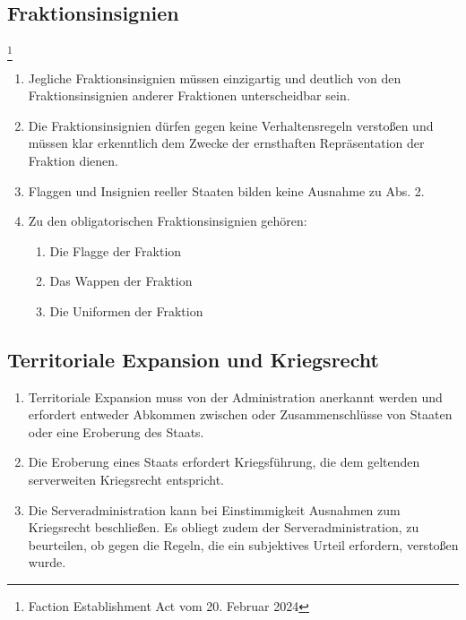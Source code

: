 \documentclass{article}
\begin{document}
\subsection{Fraktionsinsignien}\footnote{Faction Establishment Act vom 20. Februar 2024}
\begin{enumerate}[(1)]
    \item Jegliche Fraktionsinsignien müssen einzigartig und deutlich von den Fraktionsinsignien anderer Fraktionen unterscheidbar sein.
    \item Die Fraktionsinsignien dürfen gegen keine Verhaltensregeln verstoßen und müssen klar erkenntlich dem Zwecke der ernsthaften Repräsentation der Fraktion dienen.
    \item Flaggen und Insignien reeller Staaten bilden keine Ausnahme zu Abs. 2.
    \item Zu den obligatorischen Fraktionsinsignien gehören:
    \begin{enumerate}[1.]
        \item Die Flagge der Fraktion
        \item Das Wappen der Fraktion
        \item Die Uniformen der Fraktion
    \end{enumerate}
\end{enumerate}

\subsection{Territoriale Expansion und Kriegsrecht}
\begin{enumerate}[(1)]
    \item Territoriale Expansion muss von der Administration anerkannt werden und erfordert entweder Abkommen zwischen oder Zusammenschlüsse von Staaten oder eine Eroberung des Staats.
    \item Die Eroberung eines Staats erfordert Kriegsführung, die dem geltenden serverweiten Kriegsrecht entspricht.
    \item Die Serveradministration kann bei Einstimmigkeit Ausnahmen zum Kriegsrecht beschließen. Es obliegt zudem der Serveradministration, zu beurteilen, ob gegen die Regeln, die ein subjektives Urteil erfordern, verstoßen wurde. %
\end{enumerate}
\end{document}
